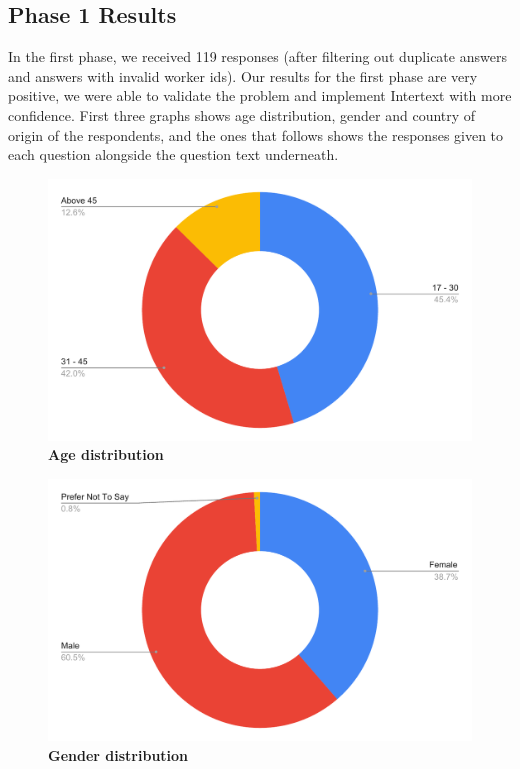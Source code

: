 \subsection{Phase 1 Results}

In the first phase, we received 119 responses (after filtering out duplicate answers and answers with invalid worker ids). Our results for the first phase are very positive, we were able to validate the problem and implement Intertext with more confidence. First three graphs shows age distribution, gender and country of origin of the respondents, and the ones that follows shows the responses given to each question alongside the question text underneath.

\begin{figure}[H]
  \centering
  \includegraphics[width=13cm]{thesis/paper/images/p1_age.pdf}
  \textbf{Age distribution}
\end{figure}

\begin{figure}[H]
  \centering
  \includegraphics[width=13cm]{thesis/paper/images/p1_gender.pdf}
  \textbf{Gender distribution}
\end{figure}

